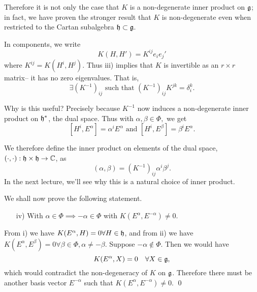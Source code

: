 Therefore it is not only the case that $K$ is a non-degenerate inner product on $\mathfrak{g}$; in fact, we have proven the stronger result that $K$ is non-degenerate even when restricted to the Cartan subalgebra $\mathfrak{h}\subset \mathfrak{g}$.

In components, we write
$$K(H,H')=K^{ij}e_i e_j'$$ where $K^{ij}=K(H^i,H^j)$. Thus iii) implies that $K$ is invertible as an $r\times r$ matrix-- it has no zero eigenvalues. That is,
$$\exists(K^{-1})_{ij}\text{ such that }(K^{-1})_{ij} K^{jk}=\delta_i^k.$$

Why is this useful? Precisely because $K^{-1}$ now induces a non-degenerate inner product on $\mathfrak{h}^*$, the dual space. Thus with $\alpha,\beta\in \Phi,$ we get
$$[H^i,E^\alpha]=\alpha^i E^\alpha\text{ and }[H^i,E^\beta]=\beta^i E^\alpha.$$
\begin{defn}
We therefore define the inner product on elements of the dual space, $(\cdot,\cdot):\mathfrak{h}\times \mathfrak{h} \to \mathbb{C}$, as
$$(\alpha,\beta)=(K^{-1})_{ij}\alpha^i \beta^j.$$
In the next lecture, we'll see why this is a natural choice of inner product.
\end{defn}

We shall now prove the following statement.
\begin{itemize}
\item[iv)] With $\alpha\in \Phi\implies -\alpha\in \Phi$ with
$K(E^\alpha,E^{-\alpha})\neq 0.$
\end{itemize}
From i) we have $K(E^\alpha,H)=0\forall H\in \mathfrak{h}$, and from ii) we have $K(E^\alpha,E^\beta)=0 \forall \beta\in \Phi, \alpha\neq -\beta$. Suppose $-\alpha \notin \Phi$. Then we would have
$$K(E^\alpha,X)=0\quad \forall X\in \mathfrak{g},$$
which would contradict the non-degeneracy of $K$ on $\mathfrak{g}$. Therefore there must be another basis vector $E^{-\alpha}$ such that $K(E^\alpha,E^{-\alpha})\neq 0$. \qed

